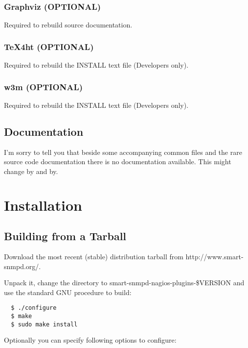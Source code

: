 \subsubsection{Graphviz (OPTIONAL)}

Required to rebuild source documentation.

\subsubsection{{\TeX}4ht (OPTIONAL)}

Required to rebuild the INSTALL text file (Developers only).

\subsubsection{w3m (OPTIONAL)}

Required to rebuild the INSTALL text file (Developers only).

\subsection{Documentation}

I'm sorry to tell you that beside some accompanying common files and the
rare source code documentation there is no documentation available. This
might change by and by.

\section{Installation}

\subsection{Building from a Tarball}

\label{build-tarball}

Download the most recent (stable) distribution tarball from
http://www.smart-snmpd.org/.

Unpack it, change the directory to smart-snmpd-nagios-plugins-\${VERSION}
and use the standard GNU procedure to build:

\begin{verbatim}
  $ ./configure
  $ make
  $ sudo make install
\end{verbatim}

Optionally you can specify following options to configure:

